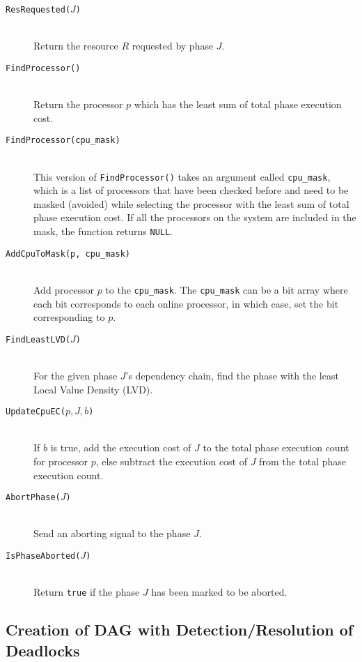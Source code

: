 \documentclass[12pt,dvips]{report}
\begin{document}
\begin{description}
	\item[\texttt{ResRequested($J$)}]	\hfill \\
		Return the resource $R$ requested by phase $J$.

	\item[\texttt{FindProcessor()}] \hfill \\
		Return the processor $p$ which has the least sum of total phase execution cost.
		
	\item[\texttt{FindProcessor(cpu\_mask)}] \hfill \\
		This version of \texttt{FindProcessor()} takes an argument called \texttt{cpu\_mask}, which is a list of 
		processors that have been checked before and need to be masked (avoided) while selecting the processor
		with the least sum of total phase execution cost. If all the processors on the system are included in 
		the mask, the function returns \texttt{NULL}.

	\item[\texttt{AddCpuToMask(p, cpu\_mask)}] \hfill \\
		Add processor $p$ to the \texttt{cpu\_mask}. The \texttt{cpu\_mask} can be a bit array where each bit 
		corresponds to each online processor, in which case, set the bit corresponding to $p$.

	\item[\texttt{FindLeastLVD($J$)}] \hfill \\
		For the given phase $J$'s dependency chain, find the phase with the least Local Value Density (LVD).

	\item[\texttt{UpdateCpuEC($p, J, b$)}] \hfill \\
		If $b$ is true, add the execution cost of $J$ to the total phase
 		execution count for processor $p$, else subtract the execution cost of
 		$J$ from the total phase execution count.
 		
	\item[\texttt{AbortPhase($J$)}] \hfill \\
		Send an aborting signal to the phase $J$.
 				
	\item[\texttt{IsPhaseAborted($J$)}] \hfill \\
		Return \texttt{true} if the phase $J$ has been marked to be aborted.
		
\end{description}

\subsection{Creation of DAG with Detection/Resolution of Deadlocks}
\end{document}
